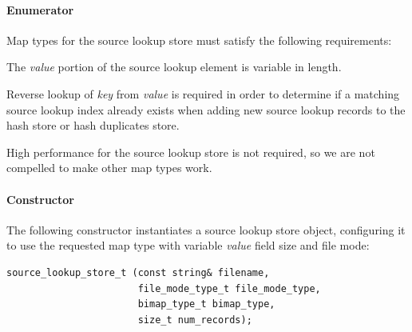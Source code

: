 \documentclass[12pt,twoside]{article}
\begin{document}
\paragraph{Enumerator}
Map types for the source lookup store must satisfy the following requirements:
\begin{compactitem}
\item The \emph{value} portion of the source lookup element is variable in length.
\item Reverse lookup of \emph{key} from \emph{value} is required
in order to determine if a matching source lookup index already exists
when adding new source lookup records to the hash store or hash duplicates store.
\item High performance for the source lookup store is not required,
so we are not compelled to make other map types work.
\end{compactitem}

\paragraph{Constructor}
The following constructor instantiates a source lookup store object,
configuring it to use the requested map type with variable \emph{value} field size and file mode:
\begin{small}
\begin{verbatim}
source_lookup_store_t (const string& filename,
                       file_mode_type_t file_mode_type,
                       bimap_type_t bimap_type,
                       size_t num_records);
\end{verbatim}
\end{small}
\end{document}

